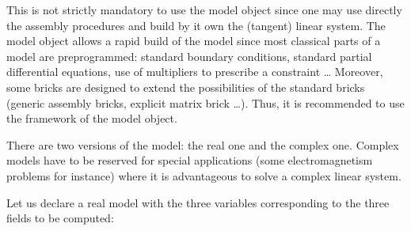 \documentclass[a4paper,11pt,english]{sphinxmanual}
\begin{document}
This is not strictly mandatory to use the model object since one may use directly the assembly procedures and build by it own the (tangent) linear system. The model object allows a rapid build of the model since most classical parts of a model are pre\sphinxhyphen{}programmed: standard boundary conditions, standard partial differential equations, use of multipliers to prescribe a constraint … Moreover, some bricks are designed to extend the possibilities of the standard bricks (generic assembly bricks, explicit matrix brick …). Thus, it is recommended to use the framework of the model object.

There are two versions of the model: the real one and the complex one. Complex models have to be reserved for special applications (some electromagnetism problems for instance) where it is advantageous to solve a complex linear system.

Let us declare a real model with the three variables corresponding to the three fields to be computed:
\end{document}
